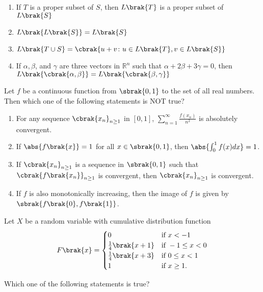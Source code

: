     \begin{enumerate}
        \item If $T$ is a proper subset of $S$, then $L\brak{T}$ is a proper subset of $L\brak{S}$
        \item $L\brak{L\brak{S}} = L\brak{S}$
        \item $L\brak{T \cup S} = \cbrak{u + v\colon u \in L\brak{T}, v \in L\brak{S}}$
        \item If $\alpha, \beta$, and $\gamma$ are three vectors in $\mathbb{R}^n$ such that $\alpha + 2\beta + 3\gamma = 0$, then $L\brak{\cbrak{\alpha, \beta}} = L\brak{\cbrak{\beta, \gamma}}$\\
    \end{enumerate}
    \item Let $f$ be a continuous function from $\sbrak{0,1}$ to the set of all real numbers. Then which one of the following statements is NOT true?  
\begin{enumerate}
\item For any sequence $\cbrak{x_n}_{n \geq 1}$ in $[0,1]$, $\sum_{n=1}^{\infty} \frac{f(x_n)}{n^2}$ is absolutely convergent.
\item If $\abs{f\brak{x}} = 1$ for all $x \in \sbrak{0,1}$, then $\abs{\int_{0}^{1} f(x) dx} = 1$.
\item If $\cbrak{x_n}_{n \geq 1}$ is a sequence in $\sbrak{0,1}$ such that $\cbrak{f\brak{x_n}}_{n \geq 1}$ is convergent, then $\cbrak{x_n}_{n \geq 1}$ is convergent.
\item If $f$ is also monotonically increasing, then the image of $f$ is given by $\sbrak{f\brak{0}, f\brak{1}}$.
\end{enumerate}
\item Let $X$ be a random variable with cumulative distribution function
\begin{align}
F\brak{x} = \begin{cases}
    0 & \text{if } x < -1 \\
    \frac{1}{4}\brak{x+1} & \text{if } -1 \leq x < 0 \\
    \frac{1}{4}\brak{x+3} & \text{if } 0 \leq x < 1 \\
    1 & \text{if } x \geq 1.
\end{cases}
\end{align}

Which one of the following statements is true?

